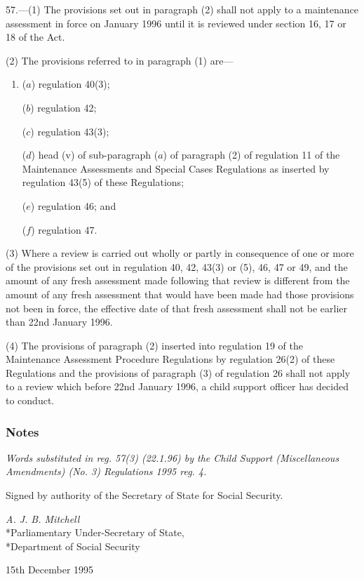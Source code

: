 \documentclass[a4paper]{article}
\newcommand\amendment[1]{\subsubsection*{Notes}{\itshape\frenchspacing\footnotesize #1 \par}}
\begin{document}
57.—(1) The provisions set out in paragraph (2) shall not apply to a maintenance assessment in force on January 1996 until it is reviewed under section 16, 17 or 18 of the Act.

(2) The provisions referred to in paragraph (1) are—
\begin{enumerate}\item[]
($a$) regulation 40(3);

($b$) regulation 42;

($c$) regulation 43(3);

($d$) head (v) of sub-paragraph ($a$) of paragraph (2) of regulation 11 of the Maintenance Assessments and Special Cases Regulations as inserted by regulation 43(5) of these Regulations;

($e$) regulation 46; and

($f$) regulation 47.
\end{enumerate}

(3) Where a review is carried out wholly or partly in consequence of one or more of the provisions set out in 
regulation 40, 42, 43(3) or (5), 46, 47 or 49,  %
and the amount of any fresh assessment made following that review is different from the amount of any fresh assessment that would have been made had those provisions not been in force, the effective date of that fresh assessment shall not be earlier than 22nd January 1996.

(4) The provisions of paragraph (2) inserted into regulation 19 of the Maintenance Assessment Procedure Regulations by regulation 26(2) of these Regulations and the provisions of paragraph (3) of regulation 26 shall not apply to a review which before 22nd January 1996, a child support officer has decided to conduct.

\amendment{
Words substituted in reg. 57(3) (22.1.96) by the Child Support (Miscellaneous Amendments) (No. 3) Regulations 1995 reg. 4.
}

\bigskip

Signed by authority of the Secretary of State for Social Security.

{\raggedleft
\emph{A. J. B. Mitchell}\\*Parliamentary Under-Secretary of State,\\*Department of Social Security

}

15th December 1995

\clearpage
\end{document}
